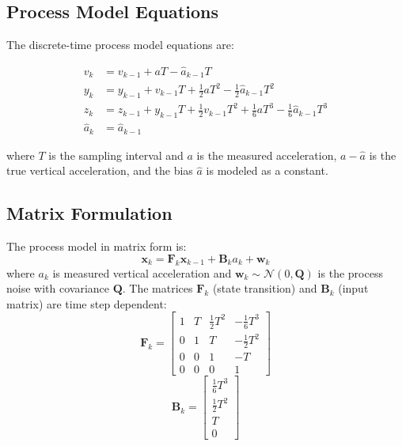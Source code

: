 \documentclass[11pt,letterpaper]{article}
\begin{document}
\subsection{Process Model Equations}

The discrete-time process model equations are:

\begin{align}
v_k &= v_{k-1} + a T - \hat{a}_{k-1} T \\
y_k &= y_{k-1} + v_{k-1} T + \frac{1}{2}a T^2 - \frac{1}{2}\hat{a}_{k-1} T^2 \\
z_k &= z_{k-1} + y_{k-1} T + \frac{1}{2}v_{k-1} T^2 + \frac{1}{6}a T^3 - \frac{1}{6}\hat{a}_{k-1} T^3 \\
\hat{a}_k &= \hat{a}_{k-1}
\end{align}

where $T$ is the sampling interval and $a$ is the measured acceleration, $a - \hat{a}$ is the true vertical acceleration, and the bias $\hat{a}$ is modeled as a constant.


\subsection{Matrix Formulation}

The process model in matrix form is:
\begin{equation}
\mathbf{x}_k = \mathbf{F}_k \mathbf{x}_{k-1} + \mathbf{B}_k a_k + \mathbf{w}_k
\end{equation}
where \( a_k \) is measured vertical acceleration and \( \mathbf{w}_k \sim \mathcal{N}(0, \mathbf{Q}) \) is the process noise with covariance \(  \bm{Q} \). The matrices \( \mathbf{F}_k \) (state transition) and \( \mathbf{B}_k \) (input matrix) are time step dependent:
\begin{equation}
\mathbf{F}_k =
\begin{bmatrix}
1 & T & \frac{1}{2}T^2 & -\frac{1}{6}T^3 \\
0 & 1 & T & -\frac{1}{2}T^2 \\
0 & 0 & 1 & -T \\
0 & 0 & 0 & 1
\end{bmatrix}
\end{equation}
\begin{equation}
\mathbf{B}_k =
\begin{bmatrix}
\frac{1}{6}T^3 \\
\frac{1}{2}T^2 \\
T \\
0
\end{bmatrix}
\end{equation}
\end{document}
